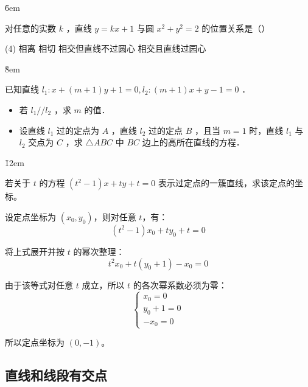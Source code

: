 \v{6em}

\begin{example}
    对任意的实数 $k$ ，直线 $y=k x+1$ 与圆 $x^2+y^2=2$ 的位置关系是（\qquad）
    \begin{tasks}(4)
        \task 相离
        \task 相切
        \task 相交但直线不过圆心
        \task 相交且直线过园心
    \end{tasks}
\end{example}

\v{8em}

\begin{example}
    已知直线 $l_1: x+(m+1) y+1=0, l_2:(m+1) x+y-1=0$ ．
    \begin{itemize}
        \item 若 $l_1 / / l_2$ ，求 $m$ 的值．
        \item 设直线 $l_1$ 过的定点为 $A$ ，直线 $l_2$ 过的定点 $B$ ，且当 $m=1$ 时，直线 $l_1$ 与 $l_2$ 交点为 $C$ ，求 $\triangle A B C$ 中 $B C$ 边上的高所在直线的方程．
    \end{itemize}
\end{example}

\v{12em}

\begin{example}
    若关于 $t$ 的方程 $(t^2-1)x+ty+t=0$ 表示过定点的一簇直线，求该定点的坐标。
\end{example}

\begin{solution}
    设定点坐标为 $(x_0,y_0)$，则对任意 $t$，有：
    \[
        (t^2-1)x_0+ty_0+t=0
    \]

    将上式展开并按 $t$ 的幂次整理：
    \[
        t^2x_0+t(y_0+1)-x_0=0
    \]

    由于该等式对任意 $t$ 成立，所以 $t$ 的各次幂系数必须为零：
    \[
        \begin{cases}
            x_0=0   \\
            y_0+1=0 \\
            -x_0=0
        \end{cases}
    \]

    所以定点坐标为 $(0,-1)$。
\end{solution}

\subsection{直线和线段有交点}

